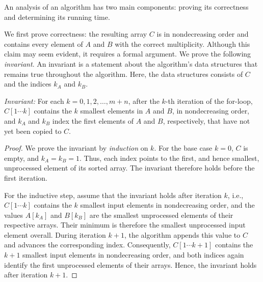 \begin{algorithmblock}[0.8\textwidth] \label{code:merge-two-sorted-arrays}
	\xxx
	\xxx
	\xxx
	\xxx
	\xxx
	\xxx
	\xxx
	\xxx
	\xxx
	\xxx
	\xxx
	\xxx
\end{algorithmblock}


An analysis of an algorithm has two main components: proving its correctness
and determining its running time.

We first prove correctness: the resulting array $C$ is in nondecreasing order
and contains every element of $A$ and $B$ with the correct multiplicity.
Although this claim may seem evident, it requires a formal argument. We prove the
following \emph{invariant}. An invariant is a statement about the algorithm's data structures
that remains true throughout the algorithm. Here, the data structures consists of $C$ and the indices
$k_A$ and $k_B$.

\emph{Invariant:} For each $k=0,1,2,\ldots,m+n$, after the $k$-th iteration of the for-loop,
$C[1\cdots k]$ contains the $k$ smallest elements in $A$ and $B$, in nondecreasing order, 
and $k_A$ and $k_B$ index the first elements of $A$ and $B$, respectively, that have not yet been
copied to $C$. 

\begin{proof}
We prove the invariant by \emph{induction} on $k$. For the base case $k=0$,
$C$ is empty, and $k_A=k_B=1$. Thus, each index points to the first, and hence
smallest, unprocessed element of its sorted array. The invariant therefore
holds before the first iteration.

For the inductive step, assume that the invariant holds after iteration $k$,
i.e., $C[1\cdots k]$ contains the $k$ smallest input elements
in nondecreasing order, and the values $A[k_A]$ and $B[k_B]$ are the smallest
unprocessed elements of their respective arrays. 
Their minimum is therefore the smallest unprocessed input
element overall. During iteration $k+1$, the algorithm appends this value to
$C$ and advances the corresponding index. Consequently, $C[1\cdots k+1]$
contains the $k+1$ smallest input elements in nondecreasing order, and both
indices again identify the first unprocessed elements of their arrays. 
Hence, the invariant holds after iteration $k+1$.
\end{proof}

